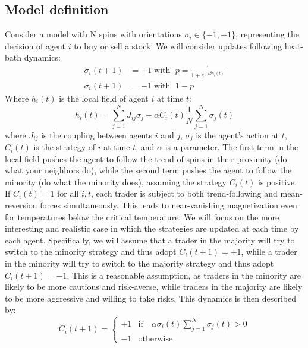 \subsection{Model definition}
Consider a model with N spins with orientations $\sigma_i\in\{-1,+1\}$, representing the decision of agent $i$ to buy or sell a stock. We will consider updates following heat-bath dynamics:
\begin{equation}
    \begin{aligned}
        \sigma_i(t+1) &= +1 \;\text{with }\; p = \frac{1}{1+e^{-2\beta h_i(t)}}\\
        \sigma_i(t+1) &= -1 \;\text{with }\; 1-p
    \end{aligned}
    \label{eq:heat_bath}
\end{equation}
Where $h_i(t)$ is the local field of agent $i$ at time $t$:
\begin{equation}
    h_i(t)=\sum_{j=1}^N J_{i j} \sigma_j-\alpha C_i(t) \frac{1}{N} \sum_{j=1}^N \sigma_j(t)
\end{equation}
where $J_{i j}$ is the coupling between agents $i$ and $j$, $\sigma_j$ is the agent's action at $t$, $C_i(t)$ is the strategy of $i$ at time $t$, and $\alpha$ is a parameter. The first term in the local field pushes the agent to follow the trend of spins in their proximity (do what your neighbors do), while the second term pushes the agent to follow the minority (do what the minority does), assuming the strategy $C_i(t)$ is positive. 
If $C_i(t)=1$ for all $i,t$, each trader is subject to both trend-following and mean-reversion forces simultaneously. This leads to near-vanishing magnetization even for temperatures below the critical temperature. 
We will focus on the more interesting and realistic case in which the strategies are updated at each time by each agent. Specifically, we will assume that a trader in the majority will try to switch to the minority strategy and thus adopt $C_i(t+1) = +1$, while a trader in the minority will try to switch to the majority strategy and thus adopt $C_i(t+1) = -1$. This is a reasonable assumption, as traders in the minority are likely to be more cautious and risk-averse, while traders in the majority are likely to be more aggressive and willing to take risks. This dynamics is then described by:
\begin{equation}
    C_i(t+1) = \begin{cases}
        +1 & \text{if} \quad \alpha\sigma_i(t) \sum_{j=1}^N \sigma_j(t)> 0\\
        -1 & \text{otherwise}
    \end{cases}
\end{equation}
